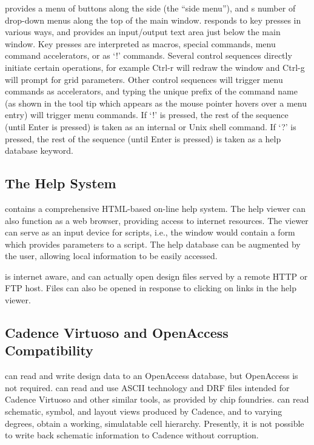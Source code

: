 {\Xic} provides a menu of buttons along the side (the ``side menu''),
and s number of drop-down menus along the top of the main window. 
{\Xic} responds to key presses in various ways, and provides an
input/output text area just below the main window.  Key presses are
interpreted as macros, special commands, menu command accelerators, or
as `!' commands.  Several control sequences directly initiate certain
operations, for example {\kb Ctrl-r} will redraw the window and {\kb
Ctrl-g} will prompt for grid parameters.  Other control sequences will
trigger menu commands as accelerators, and typing the unique prefix of
the command name (as shown in the tool tip which appears as the mouse
pointer hovers over a menu entry) will trigger menu commands.  If `!'
is pressed, the rest of the sequence (until {\kb Enter} is pressed) is
taken as an internal or Unix shell command.  If `?' is pressed, the
rest of the sequence (until {\kb Enter} is pressed) is taken as a help
database keyword.

\subsection{The Help System}

{\Xic} contains a comprehensive HTML-based on-line help system.  The
help viewer can also function as a web browser, providing access to
internet resources.  The viewer can serve as an input device for
scripts, i.e., the window would contain a form which provides
parameters to a script.  The help database can be augmented by the
user, allowing local information to be easily accessed.

{\Xic} is internet aware, and can actually open design files
served by a remote HTTP or FTP host.  Files can also be opened in
response to clicking on links in the help viewer.

\subsection{Cadence Virtuoso and OpenAccess Compatibility}

\ifoa
{\Xic} can read and write design data to an OpenAccess database, but
OpenAccess is not required.  {\Xic} can read and use ASCII technology
and DRF files intended for Cadence Virtuoso and other similar tools,
as provided by chip foundries.  {\Xic} can read schematic, symbol, and
layout views produced by Cadence, and to varying degrees, obtain a
working, simulatable cell hierarchy.  Presently, it is not possible
to write back schematic information to Cadence without corruption.

